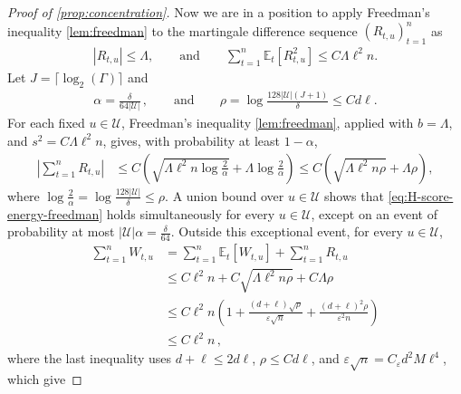 \documentclass[11pt]{article}
\newcommand{\E}{\mathbb E}
\newcommand{\1}{\mathbf 1}
\newcommand{\eps}{\varepsilon}
\begin{document}
\begin{proof}[Proof of \cref{prop:concentration}]
    Now we are in a position to apply Freedman's inequality \cref{lem:freedman} to the martingale difference sequence $(R_{t,u})_{t=1}^n$ as
    \begin{align}
        |R_{t,u}|
        \leq \Lambda,         \qquad \text{and}\qquad
        \sum_{t=1}^n\E_t[R_{t,u}^2]
        \leq C\Lambda\ell^2n.
    \end{align}
    Let $J = \lceil \log_2(\Gamma) \rceil$
    and
    \begin{align}
        \alpha=\frac{\delta}{64|\mathcal U|}\,,
        \qquad\text{and}\qquad
        \rho
        =
        \log\frac{128|\mathcal U|(J+1)}{\delta}
        \leq Cd\ell.
    \end{align}
    For each fixed $u\in\mathcal U$, Freedman's inequality
    \cref{lem:freedman}, applied with $b=\Lambda$, and $s^2=C\Lambda\ell^2n$, gives, with probability at least $1-\alpha$,
    \begin{align}
        \left|
        \sum_{t=1}^nR_{t,u}
        \right|
         & \leq
        C\left(
        \sqrt{
            \Lambda\ell^2n
            \log\frac{2}{\alpha}
        }
        +
        \Lambda\log\frac{2}{\alpha}
        \right)
        \leq
        C\left(
        \sqrt{\Lambda\ell^2n\rho}
        +
        \Lambda\rho
        \right),
        \label{eq:H-score-energy-freedman}
    \end{align}
    where $\log\frac{2}{\alpha} = \log\frac{128|\mathcal U|}{\delta} \leq\rho$.
    A union bound over $u\in\mathcal U$ shows that
    \eqref{eq:H-score-energy-freedman} holds simultaneously for every
    $u\in\mathcal U$, except on an event of probability at most $|\mathcal U|\alpha=\frac{\delta}{64}$.
    Outside this exceptional event, for every $u\in\mathcal U$,
    \begin{align}
        \sum_{t=1}^nW_{t,u}
         & =
        \sum_{t=1}^n\E_t[W_{t,u}]
        +
        \sum_{t=1}^nR_{t,u} \\
         & \leq
        C\ell^2n
        +
        C\sqrt{\Lambda\ell^2n\rho}
        +
        C\Lambda\rho        \\
         & \leq
        C\ell^2n
        \left(
        1+
        \frac{(d+\ell)\sqrt\rho}{\eps\sqrt n}
        +
        \frac{(d+\ell)^2\rho}{\eps^2n}
        \right)             \\
         & \leq C\ell^2n\,,
        \label{eq:H-score-energy}
    \end{align}
    where the last inequality uses $d+\ell\leq2d\ell$, $\rho\leq Cd\ell$, and
    $\eps\sqrt n=C_\eps d^2M\ell^4$, which give

\end{proof}
\end{document}
